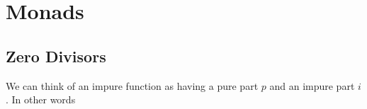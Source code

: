 
\chapter{Monads}



\section{Zero Divisors}




We can think of an impure function as having a pure part $p$ and an impure part $i$. 
In other words 